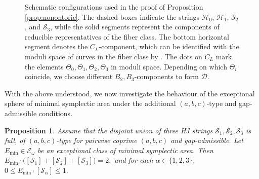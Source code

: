 \documentclass[11pt]{article}
\newtheorem{proposition}[theorem]{Proposition}
\theoremstyle{definition}
\theoremstyle{remark}
\newcommand{\st}{\mathcal{S}}
\begin{document}
\begin{figure}[htbp]
\begin{minipage}[c]{0.32\textwidth}
{%
    }
  \end{minipage}\hfill
  \caption{Schematic configurations used in the proof of Proposition \ref{prop:nonontoric}. The dashed boxes indicate the strings $\mathcal{H}_0$, $\mathcal{H}_1$, $\st_2$, and $\st_3$, while the solid segments represent the components of reducible representatives of the fiber class. The bottom horizontal segment denotes the $C_L$-component, which can be identified with the moduli space of curves in the fiber class by \cite{Zhangmoduli}. The dots on $C_L$ mark the elements $\Theta_0,\Theta_1,\Theta_2,\Theta_3$ in moduli space. Depending on which $\Theta_i$ coincide, we choose different $B_2,B_3$-components to form $\mathcal{D}$.}
  \label{fig:nonontoric}
\end{figure}

With the above understood, we now investigate the behaviour of the exceptional sphere of minimal symplectic area under the additional $(a,b,c)$-type and gap-admissible conditions.

\begin{proposition}\label{prop:HJandEmin}
  Assume that the disjoint union of three HJ strings $\st_1,\st_2,\st_3$ is full, of $(a,b,c)$-type for pairwise coprime $(a,b,c)$ and gap-admissible. Let $E_{\min}\in\mathcal{E}_{\omega}$ be an exceptional class of minimal symplectic area.
  Then
  \(
    E_{\min}\cdot\bigl([\st_1]+[\st_2]+[\st_3]\bigr)= 2,
  \)
  and for each $\alpha\in\{1,2,3\}$,
  \(
    0\le E_{\min}\cdot[\st_\alpha]\le 1.
  \)
\end{proposition}
\end{document}
